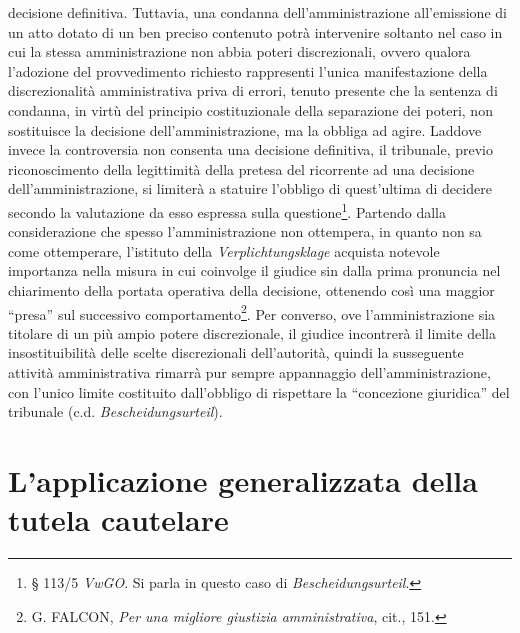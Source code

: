 \documentclass[12pt,it,a4paper,]{report}
\begin{document}
decisione definitiva. Tuttavia, una condanna dell'amministrazione
all'emissione di un atto dotato di un ben preciso contenuto potrà
intervenire soltanto nel caso in cui la stessa amministrazione non abbia
poteri discrezionali, ovvero qualora l'adozione del provvedimento
richiesto rappresenti l'unica manifestazione della discrezionalità
amministrativa priva di errori, tenuto presente che la sentenza di
condanna, in virtù del principio costituzionale della separazione dei
poteri, non sostituisce la decisione dell'amministrazione, ma la obbliga
ad agire. Laddove invece la controversia non consenta una decisione
definitiva, il tribunale, previo riconoscimento della legittimità della
pretesa del ricorrente ad una decisione dell'amministrazione, si
limiterà a statuire l'obbligo di quest'ultima di decidere secondo la
valutazione da esso espressa sulla questione\footnote{§ 113/5
  \emph{VwGO}. Si parla in questo caso di \emph{Bescheidungsurteil}.}.
Partendo dalla considerazione che spesso l'amministrazione non
ottempera, in quanto non sa come ottemperare, l'istituto della
\emph{Verplichtungsklage} acquista notevole importanza nella misura in
cui coinvolge il giudice sin dalla prima pronuncia nel chiarimento della
portata operativa della decisione, ottenendo così una maggior ``presa''
sul successivo comportamento\footnote{G. FALCON, \emph{Per una migliore
  giustizia amministrativa}, cit., 151.}. Per converso, ove
l'amministrazione sia titolare di un più ampio potere discrezionale, il
giudice incontrerà il limite della insostituibilità delle scelte
discrezionali dell'autorità, quindi la susseguente attività
amministrativa rimarrà pur sempre appannaggio dell'amministrazione, con
l'unico limite costituito dall'obbligo di rispettare la ``concezione
giuridica'' del tribunale (c.d. \emph{Bescheidungsurteil}).

\hypertarget{lapplicazione-generalizzata-della-tutela-cautelare}{%
\section{L'applicazione generalizzata della tutela
cautelare}\label{lapplicazione-generalizzata-della-tutela-cautelare}}
\end{document}
